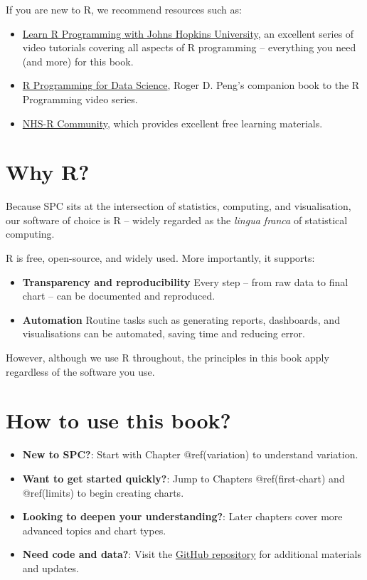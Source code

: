 \documentclass[
]{book}
\begin{document}
If you are new to R, we recommend resources such as:

\begin{itemize}
\item
  \href{https://www.youtube.com/playlist?list=PLVext98k2evi8mDNRo4MwIgVgSmwM3cS8}{Learn
  R Programming with Johns Hopkins University}, an excellent series of
  video tutorials covering all aspects of R programming -- everything
  you need (and more) for this book.
\item
  \href{https://bookdown.org/rdpeng/rprogdatascience/}{R Programming for
  Data Science}, Roger D. Peng's companion book to the R Programming
  video series.
\item
  \href{https://nhsrcommunity.com/}{NHS-R Community}, which provides
  excellent free learning materials.
\end{itemize}

\section*{Why R?}\label{why-r}

Because SPC sits at the intersection of statistics, computing, and
visualisation, our software of choice is R -- widely regarded as the
\emph{lingua franca} of statistical computing.

R is free, open-source, and widely used. More importantly, it supports:

\begin{itemize}
\item
  \textbf{Transparency and reproducibility} Every step -- from raw data
  to final chart -- can be documented and reproduced.
\item
  \textbf{Automation} Routine tasks such as generating reports,
  dashboards, and visualisations can be automated, saving time and
  reducing error.
\end{itemize}

However, although we use R throughout, the principles in this book apply
regardless of the software you use.

\section*{How to use this book?}\label{how-to-use-this-book}

\begin{itemize}
\item
  \textbf{New to SPC?}: Start with Chapter @ref(variation) to understand
  variation.
\item
  \textbf{Want to get started quickly?}: Jump to Chapters
  @ref(first-chart) and @ref(limits) to begin creating charts.
\item
  \textbf{Looking to deepen your understanding?}: Later chapters cover
  more advanced topics and chart types.
\item
  \textbf{Need code and data?}: Visit the
  \href{https://github.com/anhoej/spc4hc}{GitHub repository} for
  additional materials and updates.
\end{itemize}
\end{document}

